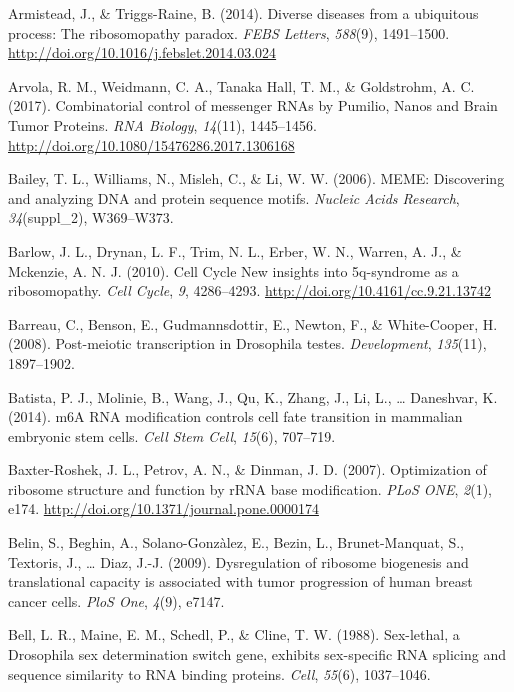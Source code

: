 \documentclass[12pt,twoside]{reedthesis}
\newlength{\cslhangindent}
\newenvironment{cslreferences}%
  {\setlength{\parindent}{0pt}%
  \everypar{\setlength{\hangindent}{\cslhangindent}}\ignorespaces}%
  {\par}
\begin{document}
\begin{cslreferences}
\leavevmode\hypertarget{ref-Armistead2014a}{}%
Armistead, J., \& Triggs-Raine, B. (2014). Diverse diseases from a ubiquitous process: The ribosomopathy paradox. \emph{FEBS Letters}, \emph{588}(9), 1491--1500. \url{http://doi.org/10.1016/j.febslet.2014.03.024}

\leavevmode\hypertarget{ref-Arvola2017n}{}%
Arvola, R. M., Weidmann, C. A., Tanaka Hall, T. M., \& Goldstrohm, A. C. (2017). Combinatorial control of messenger RNAs by Pumilio, Nanos and Brain Tumor Proteins. \emph{RNA Biology}, \emph{14}(11), 1445--1456. \url{http://doi.org/10.1080/15476286.2017.1306168}

\leavevmode\hypertarget{ref-Bailey2006a}{}%
Bailey, T. L., Williams, N., Misleh, C., \& Li, W. W. (2006). MEME: Discovering and analyzing DNA and protein sequence motifs. \emph{Nucleic Acids Research}, \emph{34}(suppl\_2), W369--W373.

\leavevmode\hypertarget{ref-Barlow2010a}{}%
Barlow, J. L., Drynan, L. F., Trim, N. L., Erber, W. N., Warren, A. J., \& Mckenzie, A. N. J. (2010). Cell Cycle New insights into 5q-syndrome as a ribosomopathy. \emph{Cell Cycle}, \emph{9}, 4286--4293. \url{http://doi.org/10.4161/cc.9.21.13742}

\leavevmode\hypertarget{ref-Barreau2008d}{}%
Barreau, C., Benson, E., Gudmannsdottir, E., Newton, F., \& White-Cooper, H. (2008). Post-meiotic transcription in Drosophila testes. \emph{Development}, \emph{135}(11), 1897--1902.

\leavevmode\hypertarget{ref-Batista2014}{}%
Batista, P. J., Molinie, B., Wang, J., Qu, K., Zhang, J., Li, L., \ldots{} Daneshvar, K. (2014). m6A RNA modification controls cell fate transition in mammalian embryonic stem cells. \emph{Cell Stem Cell}, \emph{15}(6), 707--719.

\leavevmode\hypertarget{ref-Baxter-Roshek2007f}{}%
Baxter-Roshek, J. L., Petrov, A. N., \& Dinman, J. D. (2007). Optimization of ribosome structure and function by rRNA base modification. \emph{PLoS ONE}, \emph{2}(1), e174. \url{http://doi.org/10.1371/journal.pone.0000174}

\leavevmode\hypertarget{ref-Belin2009a}{}%
Belin, S., Beghin, A., Solano-Gonzàlez, E., Bezin, L., Brunet-Manquat, S., Textoris, J., \ldots{} Diaz, J.-J. (2009). Dysregulation of ribosome biogenesis and translational capacity is associated with tumor progression of human breast cancer cells. \emph{PloS One}, \emph{4}(9), e7147.

\leavevmode\hypertarget{ref-Bell1988}{}%
Bell, L. R., Maine, E. M., Schedl, P., \& Cline, T. W. (1988). Sex-lethal, a Drosophila sex determination switch gene, exhibits sex-specific RNA splicing and sequence similarity to RNA binding proteins. \emph{Cell}, \emph{55}(6), 1037--1046.


\end{cslreferences}
\end{document}
